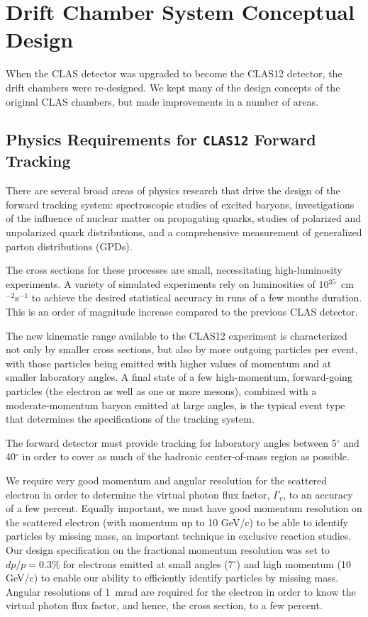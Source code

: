 \section{Drift Chamber System Conceptual Design}

When the CLAS detector was upgraded to become the CLAS12 detector, the
drift chambers were re-designed.  We kept many of the design concepts
of the original CLAS chambers, but made improvements in a number
of areas.

\subsection{Physics Requirements for {\tt CLAS12} Forward Tracking}

There are several broad areas of physics research that drive 
the design of the forward tracking system: 
spectroscopic studies of excited baryons, investigations of 
the influence of nuclear matter on propagating quarks, studies of polarized 
and unpolarized quark distributions, and a comprehensive measurement of 
generalized parton distributions (GPDs). 

The cross sections for these processes are small, necessitating high-luminosity 
experiments.  A variety of simulated experiments rely on luminosities of 
10$^{35}$~cm$^{-2}$s$^{-1}$ to achieve the desired statistical accuracy in 
runs of a few months duration.  This is an order of magnitude increase
compared to the previous CLAS detector.  

The new kinematic range available to the CLAS12 experiment is
characterized not only by smaller cross sections, but also by more outgoing 
particles per event, with those particles being emitted with higher values 
of momentum and at smaller laboratory angles.  
A final state of a few high-momentum, forward-going particles (the electron as well as one 
or more mesons), combined with a moderate-momentum baryon emitted at large 
angles, is the typical event type that determines the specifications of the 
tracking system. 

The forward detector must provide tracking for laboratory angles between 5$^\circ$ 
and 40$^\circ$ in order to cover as much of 
the hadronic center-of-mass region as possible.  

We require very good momentum 
and angular resolution for the scattered electron in order to determine the 
virtual photon flux factor, $\Gamma_v$, to an accuracy of a few percent.
Equally important, we must have good momentum resolution on the scattered
electron (with momentum up to 10 GeV/c) to be able to identify particles
by missing mass, an important technique in exclusive reaction studies.
Our design specification on the fractional momentum resolution was set to
$dp/p = 0.3\%$ for electrons emitted at small angles (7$^{\circ}$) and high
momentum (10 GeV/c) to enable our ability to efficiently identify
particles by missing mass.  Angular resolutions of 1~mrad are required for the electron 
in order to know the virtual photon flux factor, and hence, the cross section, 
to a few percent. 

